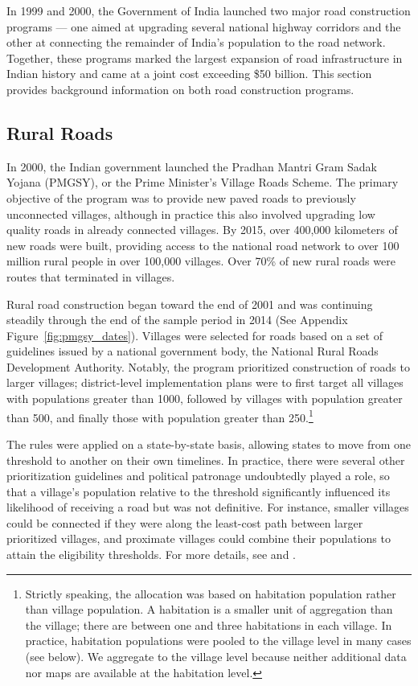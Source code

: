
In 1999 and 2000, the Government of India launched two major road
construction programs --- one aimed at upgrading several national
highway corridors and the other at connecting the remainder of India's
population to the road network. Together, these programs marked the
largest expansion of road infrastructure in Indian history and came at
a joint cost exceeding \$50 billion. This section provides background
information on both road construction programs.

\subsection{Rural Roads}

In 2000, the Indian government launched the Pradhan Mantri Gram Sadak
Yojana (PMGSY), or the Prime Minister's Village Roads Scheme. The
primary objective of the program was to provide new paved roads to
previously unconnected villages, although in practice this also
involved upgrading low quality roads in already connected villages. By
2015, over 400,000 kilometers of new roads were built, providing
access to the national road network to over 100 million rural people
in over 100,000 villages. Over 70\% of new rural roads were routes
that terminated in villages.

Rural road construction began toward the end of 2001 and was
continuing steadily through the end of the sample period in 2014 (See
Appendix Figure~\ref{fig:pmgsy_dates}). Villages were selected for
roads based on a set of guidelines issued by a national government
body, the National Rural Roads Development Authority. Notably, the
program prioritized construction of roads to larger villages;
district-level implementation plans were to first target all villages
with populations greater than 1000, followed by villages with
population greater than 500, and finally those with population greater
than 250.\footnote{Strictly speaking, the allocation was based on
  habitation population rather than village population. A habitation
  is a smaller unit of aggregation than the village; there are between
  one and three habitations in each village. In practice, habitation
  populations were pooled to the village level in many cases (see
  below). We aggregate to the village level because neither additional
  data nor maps are available at the habitation level.}

The rules were applied on a state-by-state basis, allowing states to
move from one threshold to another on their own timelines. In
practice, there were several other prioritization guidelines and
political patronage undoubtedly played a role, so that a village's
population relative to the threshold significantly influenced its
likelihood of receiving a road but was not definitive. For instance,
smaller villages could be connected if they were along the least-cost
path between larger prioritized villages, and proximate villages could
combine their populations to attain the eligibility thresholds. For
more details, see  and .

